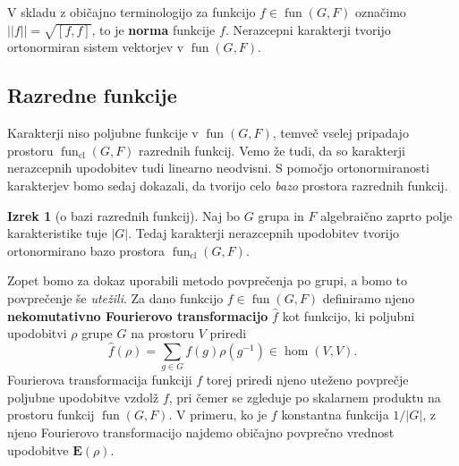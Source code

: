 \documentclass[11pt]{book}
\def\EE{\mathbf{E}}
\DeclareMathOperator\cl{cl}
\DeclareMathOperator\fun{fun}
\def\definicija{\color{rdeca}\bf}
\theoremstyle{definition}
\theoremstyle{zgled}
\theoremstyle{zgledbrezstevilke}
\theoremstyle{odprtproblem}
\theoremstyle{domacanaloga}
\theoremstyle{izrek}
\newtheorem{izrek}[theorem]{Izrek}
\begin{document}
V skladu z običajno terminologijo za funkcijo $f \in \fun(G,F)$ označimo $||f|| = \sqrt{[ f, f ]}$, to je {\definicija norma} funkcije $f$. Nerazcepni karakterji tvorijo ortonormiran sistem vektorjev v $\fun(G,F)$.

\subsection{Razredne funkcije}

Karakterji niso poljubne funkcije v $\fun(G,F)$, temveč vselej pripadajo prostoru $\fun_{\cl}(G,F)$ razrednih funkcij. Vemo že tudi, da so karakterji nerazcepnih upodobitev tudi linearno neodvisni. S pomočjo ortonormiranosti karakterjev bomo sedaj dokazali, da tvorijo celo \emph{bazo} prostora razrednih funkcij. 

\begin{izrek}[o bazi razrednih funkcij]
    Naj bo $G$ grupa in $F$ algebraično zaprto polje karakteristike tuje $|G|$. Tedaj karakterji nerazcepnih upodobitev tvorijo ortonormirano bazo prostora $\fun_{\cl}(G,F)$.
\end{izrek}

Zopet bomo za dokaz uporabili metodo povprečenja po grupi, a bomo to povprečenje še \emph{utežili}. Za dano funkcijo $f \in \fun(G,F)$ definiramo njeno {\definicija nekomutativno Fourierovo transformacijo} $\hat{f}$ kot funkcijo, ki poljubni upodobitvi $\rho$ grupe $G$ na prostoru $V$ priredi
\[
    \hat{f}(\rho) = \sum_{g \in G} f(g) \rho(g^{-1}) \in \hom(V,V).
\]
Fourierova transformacija funkciji $f$ torej priredi njeno uteženo povprečje poljubne upodobitve vzdolž $f$, pri čemer se zgleduje po skalarnem produktu na prostoru funkcij $\fun(G,F)$. V primeru, ko je $f$ konstantna funkcija $1/|G|$, z njeno Fourierovo transformacijo najdemo običajno povprečno vrednost upodobitve $\EE(\rho)$.
\end{document}
